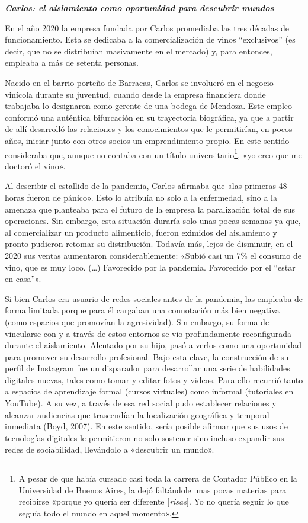 \emph{\textbf{Carlos: el aislamiento como oportunidad para descubrir mundos}}

En el año 2020 la empresa fundada por Carlos promediaba las tres décadas de funcionamiento. Esta se dedicaba a la comercialización de vinos ``exclusivos'' (es decir, que no se distribuían masivamente en el mercado) y, para entonces, empleaba a más de setenta personas.

Nacido en el barrio porteño de Barracas, Carlos se involucró en el negocio vinícola durante su juventud, cuando desde la empresa financiera donde trabajaba lo designaron como gerente de una bodega de Mendoza. Este empleo conformó una auténtica bifurcación en su trayectoria biográfica, ya que a partir de allí desarrolló las relaciones y los conocimientos que le permitirían, en pocos años, iniciar junto con otros socios un emprendimiento propio. En este sentido consideraba que, aunque no contaba con un título universitario\footnote{A pesar de que había cursado casi toda la carrera de Contador Público en la Universidad de Buenos Aires, la dejó faltándole unas pocas materias para recibirse «porque yo quería ser diferente {[}\emph{risas}{]}. Yo no quería seguir lo que seguía todo el mundo en aquel momento».}, «yo creo que me doctoró el vino».

Al describir el estallido de la pandemia, Carlos afirmaba que «las primeras 48 horas fueron de pánico». Esto lo atribuía no solo a la enfermedad, sino a la amenaza que planteaba para el futuro de la empresa la paralización total de sus operaciones. Sin embargo, esta situación duraría solo unas pocas semanas ya que, al comercializar un producto alimenticio, fueron eximidos del aislamiento y pronto pudieron retomar su distribución. Todavía más, lejos de disminuir, en el 2020 sus ventas aumentaron considerablemente: «Subió casi un 7\% el consumo de vino, que es muy loco. (\ldots) Favorecido por la pandemia. Favorecido por el ``estar en casa''».

Si bien Carlos era usuario de redes sociales antes de la pandemia, las empleaba de forma limitada porque para él cargaban una connotación más bien negativa (como espacios que promovían la agresividad). Sin embargo, su forma de vincularse con y a través de estos entornos se vio profundamente reconfigurada durante el aislamiento. Alentado por su hijo, pasó a verlos como una oportunidad para promover su desarrollo profesional. Bajo esta clave, la construcción de su perfil de Instagram fue un disparador para desarrollar una serie de habilidades digitales nuevas, tales como tomar y editar fotos y videos. Para ello recurrió tanto a espacios de aprendizaje formal (cursos virtuales) como informal (tutoriales en YouTube). A su vez, a través de esa red social pudo establecer relaciones y alcanzar audiencias que trascendían la localización geográfica y temporal inmediata (Boyd, 2007). En este sentido, sería posible afirmar que sus usos de tecnologías digitales le permitieron no solo sostener sino incluso expandir sus redes de sociabilidad, llevándolo a «descubrir un mundo».

